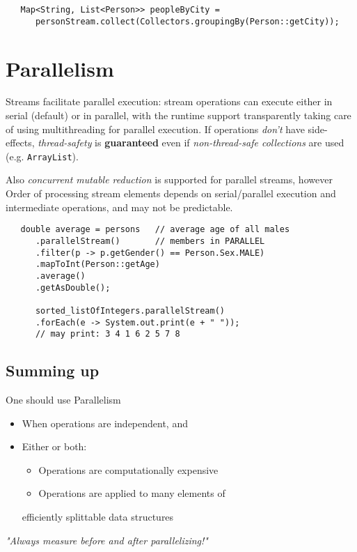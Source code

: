 \begin{lstlisting}
   Map<String, List<Person>> peopleByCity =
      personStream.collect(Collectors.groupingBy(Person::getCity));
\end{lstlisting}

\section{Parallelism}
Streams facilitate parallel execution:
stream operations can execute either in serial
(default) or in parallel, with the runtime support transparently taking care of using multithreading
for parallel execution.
If operations \textit{don’t} have side-effects, \textit{thread-safety} is
\textbf{guaranteed} even if \textit{non-thread-safe collections} are
used (e.g. \lstinline|ArrayList|).

Also \textit{concurrent mutable reduction} is supported for parallel streams, however
Order of processing stream elements depends on
serial/parallel execution and intermediate operations,
and may not be predictable.

\begin{lstlisting}
   double average = persons   // average age of all males
      .parallelStream()       // members in PARALLEL
      .filter(p -> p.getGender() == Person.Sex.MALE)
      .mapToInt(Person::getAge)
      .average()
      .getAsDouble();

      sorted_listOfIntegers.parallelStream()
      .forEach(e -> System.out.print(e + " "));
      // may print: 3 4 1 6 2 5 7 8
\end{lstlisting}

\subsection{Summing up}
One should use Parallelism
\begin{itemize}
   \item When operations are independent, and
   \item Either or both:
   \begin{itemize}
      \item Operations are computationally expensive
      \item Operations are applied to many elements of
   \end{itemize}
   efficiently splittable data structures
\end{itemize}
\emph{"Always measure before and after \emph{parallelizing}!"}

